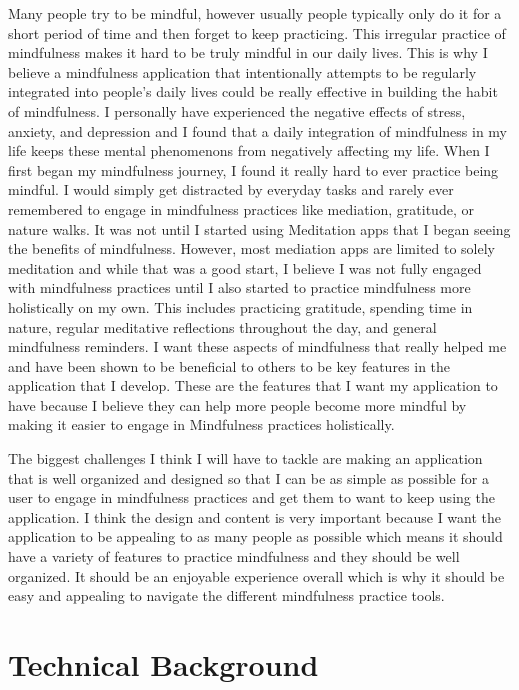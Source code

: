 \documentclass[10pt,twocolumn]{article}
\begin{document}
Many people try to be mindful, however usually people typically only do it for a short period of time and then forget to keep practicing. This irregular practice of mindfulness makes it hard to be truly mindful in our daily lives. This is why I believe a mindfulness application that intentionally attempts to be regularly integrated into people's daily lives could be really effective in building the habit of mindfulness. I personally have experienced the negative effects of stress, anxiety, and depression and I found that a  daily integration of mindfulness in my life keeps these mental phenomenons from negatively affecting my life. When I first began my mindfulness journey, I found it really hard to ever practice being mindful. I would simply get distracted by everyday tasks and rarely ever remembered to engage in mindfulness practices like mediation, gratitude, or nature walks. It was not until I started using Meditation apps that I began seeing the benefits of mindfulness. However, most mediation apps are limited to solely meditation and while that was a good start, I believe I was not fully engaged with mindfulness practices until I also started to practice mindfulness more holistically on my own. This includes practicing gratitude, spending time in nature, regular meditative reflections throughout the day, and general mindfulness reminders. I want these aspects of mindfulness that really helped me and have been shown to be beneficial to others to be key features in the application that I develop. These are the features that I want my application to have because I believe they can help more people become more mindful by making it easier to engage in Mindfulness practices holistically. 

The biggest challenges I think I will have to tackle are making an application that is well organized and designed so that I can be as simple as possible for a user to engage in mindfulness practices and get them to want to keep using the application. I think the design and content is very important because I want the application to be appealing to as many people as possible which means it should have a variety of features to practice mindfulness and they should be well organized. It should be an enjoyable experience overall which is why it should be easy and appealing to navigate the different mindfulness practice tools.
\section{Technical Background}
\end{document}
